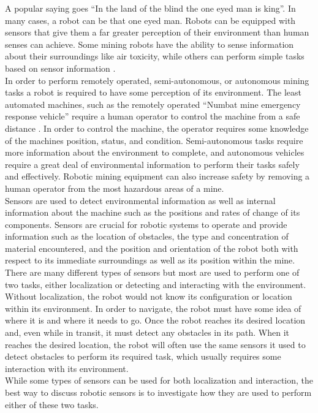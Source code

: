 A popular saying goes ``In the land of the blind the one eyed man is king''. In many cases, a robot can be that one eyed man. Robots can be equipped with sensors that give them a far greater perception of their environment than human senses can achieve. Some mining robots have the ability to sense information about their surroundings like air toxicity, while others can perform simple tasks based on sensor information \cite{uground}.\\

In order to perform remotely operated, semi-autonomous, or autonomous mining tasks a robot is required to have some perception of its environment. The least automated machines, such as the remotely operated ``Numbat mine emergency response vehicle'' require a human operator to control the machine from a safe distance \cite{numbat}. In order to control the machine, the operator requires some knowledge of the machines position, status, and condition. Semi-autonomous tasks require more information about the environment to complete, and autonomous vehicles require a great deal of environmental information to perform their tasks safely and effectively. Robotic mining equipment can also increase safety by removing a human operator from the most hazardous areas of a mine.\\

Sensors are used to detect environmental information as well as internal information about the machine such as the positions and rates of change of its components. Sensors are crucial for robotic systems to operate and provide information such as the location of obstacles, the type and concentration of material encountered, and the position and orientation of the robot both with respect to its immediate surroundings as well as its position within the mine. There are many different types of sensors but most are used to perform one of two tasks, either localization or detecting and interacting with the environment. Without localization, the robot would not know its configuration or location within its environment. In order to navigate, the robot must have some idea of where it is and where it needs to go. Once the robot reaches its desired location and, even while in transit, it must detect any obstacles in its path. When it reaches the desired location, the robot will often use the same sensors it used to detect obstacles to perform its required task, which usually requires some interaction with its environment.\\

While some types of sensors can be used for both localization and interaction, the best way to discuss robotic sensors is to investigate how they are used to perform either of these two tasks.\\

